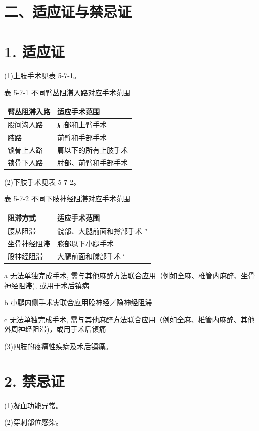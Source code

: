 \documentclass[10pt]{article}
\begin{document}
\section*{二、适应证与禁忌证}
\section*{1. 适应证}
(1)上肢手术见表 5-7-1。

表 5-7-1 不同臂丛阻滞入路对应手术范围

\begin{center}
\begin{tabular}{ll}
\hline
臂丛阻滞入路 & 适应手术范围 \\
\hline
股间沟人路 & 肩部和上臂手术 \\
腋路 & 前臂和手部手术 \\
锁骨上人路 & 肩以下的所有上肢手术 \\
锁骨下人路 & 肘部、前臂和手部手术 \\
\hline
\end{tabular}
\end{center}

(2)下肢手术见表 5-7-2。

表 5-7-2 不同下肢神经阻滞对应手术范围

\begin{center}
\begin{tabular}{ll}
\hline
阻滞方式 & 适应手术范围 \\
\hline
腰从阻滞 & 䯘部、大腿前面和撙部手术 ${ }^{a}$ \\
坐骨神经阻滞 & 滕部以下小腿手术 \\
股神经阻滞 & 大腿前面和滕部手术 ${ }^{c}$ \\
\hline
\end{tabular}
\end{center}

a 无法单独完成手术, 需与其他麻醉方法联合应用（例如全麻、椎管内麻醉、坐骨神经阻滞), 或用于术后镇病

b 小腿内侧手术需联合应用股神经／隐神经阻滞

c 无法单独完成手术, 需与其他麻醉方法联合应用（例如全麻、椎管内麻醉、其他外周神经阻滞)，或用于术后镇痛

(3)四肢的疼痛性疾病及术后镇痛。

\section*{2. 禁忌证}
(1)凝血功能异常。

(2)穿刺部位感染。
\end{document}
